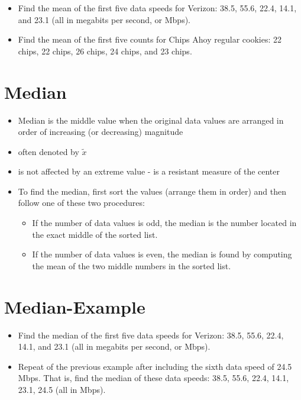 \documentclass[]{book}
\providecommand{\tightlist}{%
  \setlength{\itemsep}{0pt}\setlength{\parskip}{0pt}}
\begin{document}
\begin{itemize}
\item
  Find the mean of the first five data speeds for Verizon: 38.5, 55.6, 22.4, 14.1, and 23.1 (all in megabits per second, or Mbps).
\item
  Find the mean of the first five counts for Chips Ahoy regular cookies: 22 chips, 22 chips, 26 chips, 24 chips, and 23 chips.
\end{itemize}

\hypertarget{median}{%
\section{Median}\label{median}}

\begin{itemize}
\tightlist
\item
  Median is the middle value when the original data values are arranged in order of increasing (or decreasing) magnitude
\item
  often denoted by \(\tilde{x}\)\\
\item
  is not affected by an extreme value - is a resistant measure of the center
\item
  To find the median, first sort the values (arrange them in order) and then follow one of these two procedures:

  \begin{itemize}
  \tightlist
  \item
    If the number of data values is odd, the median is the number located in the exact middle of the sorted list.
  \item
    If the number of data values is even, the median is found by computing the mean of the two middle numbers in the sorted list.
  \end{itemize}
\end{itemize}

\hypertarget{median-example}{%
\section{Median-Example}\label{median-example}}

\begin{itemize}
\tightlist
\item
  Find the median of the first five data speeds for Verizon: 38.5, 55.6, 22.4, 14.1, and 23.1 (all in megabits per second, or Mbps).
\item
  Repeat of the previous example after including the sixth data speed of 24.5 Mbps. That is, find the median of these data speeds: 38.5, 55.6, 22.4, 14.1, 23.1, 24.5 (all in Mbps).
\end{itemize}
\end{document}
